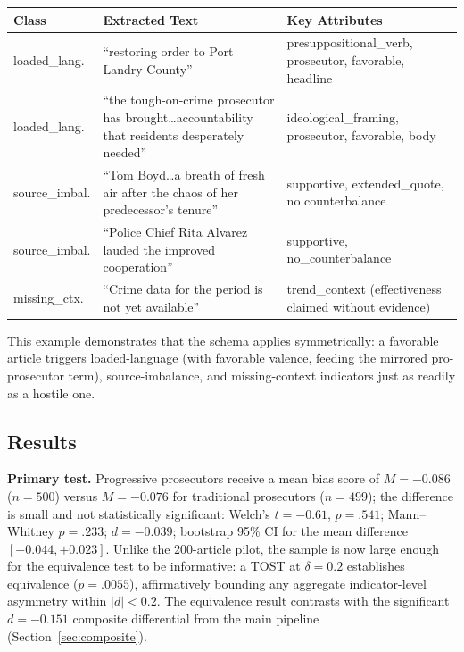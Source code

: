 \documentclass[12pt, letterpaper]{article}
\begin{document}
\begin{appendices}
\begin{table}[H]
\centering\small
\begin{tabular}{p{2.5cm}p{5.8cm}p{5cm}}
\toprule
Class & Extracted Text & Key Attributes \\
\midrule
loaded\_lang. & ``restoring order to Port Landry County'' & presuppositional\_verb, prosecutor, favorable, headline \\
loaded\_lang. & ``the tough-on-crime prosecutor has brought\ldots accountability that residents desperately needed'' & ideological\_framing, prosecutor, favorable, body \\
source\_imbal. & ``Tom Boyd\ldots a breath of fresh air after the chaos of her predecessor's tenure'' & supportive, extended\_quote, no counterbalance \\
source\_imbal. & ``Police Chief Rita Alvarez lauded the improved cooperation'' & supportive, no\_counterbalance \\
missing\_ctx. & ``Crime data for the period is not yet available'' & trend\_context (effectiveness claimed without evidence) \\
\bottomrule
\end{tabular}
\end{table}

\noindent This example demonstrates that the schema applies symmetrically: a favorable article triggers loaded-language (with favorable valence, feeding the mirrored pro-prosecutor term), source-imbalance, and missing-context indicators just as readily as a hostile one.

\subsection*{Results}

\textbf{Primary test.} Progressive prosecutors receive a mean bias score of $M = -0.086$ ($n = 500$) versus $M = -0.076$ for traditional prosecutors ($n = 499$); the difference is small and not statistically significant: Welch's $t = -0.61$, $p = .541$; Mann--Whitney $p = .233$; $d = -0.039$; bootstrap 95\% CI for the mean difference $[-0.044, +0.023]$. Unlike the 200-article pilot, the sample is now large enough for the equivalence test to be informative: a TOST at $\delta = 0.2$ establishes equivalence ($p = .0055$), affirmatively bounding any aggregate indicator-level asymmetry within $|d| < 0.2$. The equivalence result contrasts with the significant $d = -0.151$ composite differential from the main pipeline (Section~\ref{sec:composite}).


\end{appendices}
\end{document}
